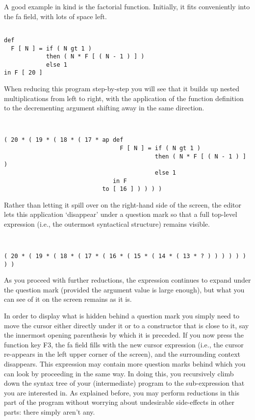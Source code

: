 A good example in kind is the {\mys factorial function}. Initially, it
fits conveniently
into the {\sc fa} field, with lots of space left. 
\begin{verbatim}

def 
  F [ N ] = if ( N gt 1 )
            then ( N * F [ ( N - 1 ) ] )
            else 1
in F [ 20 ]

\end{verbatim}
When reducing this program step-by-step you will see that it builds up nested
multiplications from left to right, with the application of the 
function definition to the decrementing argument 
shifting away in the same direction.
\begin{verbatim}


( 20 * ( 19 * ( 18 * ( 17 * ap def 
                                 F [ N ] = if ( N gt 1 )
                                           then ( N * F [ ( N - 1 ) ] )
                                           else 1
                               in F
                            to [ 16 ] ) ) ) )

\end{verbatim}
 Rather than letting it spill over on the right-hand
side of the screen, the editor lets this application `disappear'
 under a question mark so that a full {\mys top-level expression} (i.e., the
outermost syntactical structure) remains visible.
\begin{verbatim}


( 20 * ( 19 * ( 18 * ( 17 * ( 16 * ( 15 * ( 14 * ( 13 * ? ) ) ) ) ) ) ) )

\end{verbatim}

 As you proceed with further reductions, the expression continues
 to expand under the question mark 
(provided the argument value is large enough), but 
what you can see of it on the screen remains as it is. 

In order to display what is hidden behind a question mark you simply need to
move the cursor either directly under it or to a constructor that is close to it, say
the innermost opening parenthesis by which it is preceded. If you now press the
function key F3, the {\sc fa} field fills with the new cursor expression (i.e., the cursor
re-appears in the left upper corner of the screen), and the
surrounding context disappears. This expression may contain more question marks
behind which you can look by proceeding in the same way. In doing this, you
recursively {\mys climb down} the syntax tree of your (intermediate) program to the sub-expression that you are interested in. As explained before, you may perform reductions in this part of the program
without worrying about undesirable side-effects in other parts: there simply aren't any.

